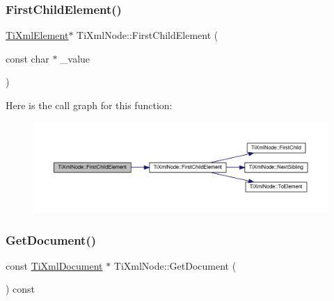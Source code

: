 \subsubsection{\texorpdfstring{First\+Child\+Element()}{FirstChildElement()}\hspace{0.1cm}{\footnotesize\ttfamily [4/4]}}
{\footnotesize\ttfamily \hyperlink{class_ti_xml_element}{Ti\+Xml\+Element}$\ast$ Ti\+Xml\+Node\+::\+First\+Child\+Element (\begin{DoxyParamCaption}\item[{const char $\ast$}]{\+\_\+value }\end{DoxyParamCaption})\hspace{0.3cm}{\ttfamily [inline]}}

Here is the call graph for this function\+:
\nopagebreak
\begin{figure}[H]
\begin{center}
\leavevmode
\includegraphics[width=350pt]{class_ti_xml_node_a6936ae323675071808ac4840379e57f5_cgraph}
\end{center}
\end{figure}
\mbox{\label{class_ti_xml_node_adcb070acefcbaedaa0673d82e530538b}} 
\subsubsection{\texorpdfstring{Get\+Document()}{GetDocument()}\hspace{0.1cm}{\footnotesize\ttfamily [1/2]}}
{\footnotesize\ttfamily const \hyperlink{class_ti_xml_document}{Ti\+Xml\+Document} $\ast$ Ti\+Xml\+Node\+::\+Get\+Document (\begin{DoxyParamCaption}{ }\end{DoxyParamCaption}) const}


